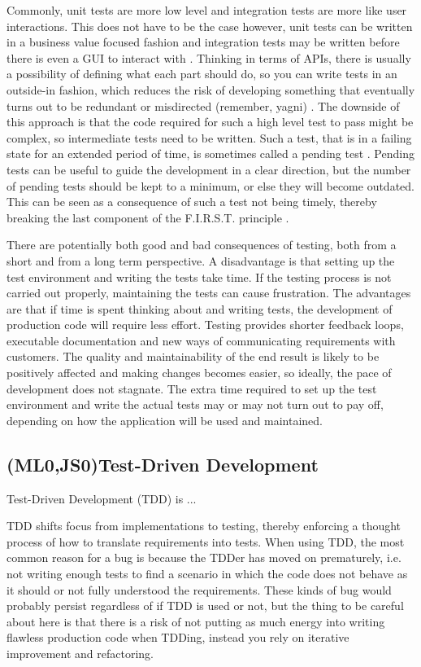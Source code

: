 \documentclass[11pt]{article}
\begin{document}
Commonly, unit tests are more low level and integration tests are more like user interactions. This does not have to be the case however, unit tests can be written in a business value focused fashion and integration tests may be written before there is even a GUI to interact with \cite[question~20]{Ahnve}. Thinking in terms of APIs, there is usually a possibility of defining what each part should do, so you can write tests in an outside-in fashion, which reduces the risk of developing something that eventually turns out to be redundant or misdirected (remember, \gls{yagni}) \cite[question~29]{Ahnve}. The downside of this approach is that the code required for such a high level test to pass might be complex, so intermediate tests need to be written. Such a test, that is in a failing state for an extended period of time, is sometimes called a pending test \cite[question~31]{Ahnve}. Pending tests can be useful to guide the development in a clear direction, but the number of pending tests should be kept to a minimum, or else they will become outdated. This can be seen as a consequence of such a test not being timely, thereby breaking the last component of the F.I.R.S.T. principle \cite[p.~132-133]{Clean}.

There are potentially both good and bad consequences of testing, both from a short and from a long term perspective. A disadvantage is that setting up the test environment and writing the tests take time. If the testing process is not carried out properly, maintaining the tests can cause frustration. The advantages are that if time is spent thinking about and writing tests, the development of production code will require less effort. Testing provides shorter feedback loops, executable documentation and new ways of communicating requirements with customers. The quality and maintainability of the end result is likely to be positively affected and making changes becomes easier, so ideally, the pace of development does not stagnate. The extra time required to set up the test environment and write the actual tests may or may not turn out to pay off, depending on how the application will be used and maintained.

\subsection{(ML0,JS0)Test-Driven Development}
\label{subsec:tdd}

Test-Driven Development (TDD) is ...

TDD shifts focus from implementations to testing, thereby enforcing a thought process of how to translate requirements into tests. When using TDD, the most common reason for a bug is because the TDDer has moved on prematurely, i.e. not writing enough tests to find a scenario in which the code does not behave as it should or not fully understood the requirements. These kinds of bug would probably persist regardless of if TDD is used or not, but the thing to be careful about here is that there is a risk of not putting as much energy into writing flawless production code when TDDing, instead you rely on iterative improvement and refactoring. %
\end{document}
